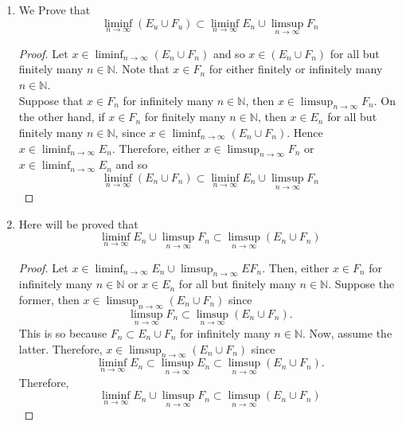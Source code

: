 \documentclass[12pt]{article}
\newcommand{\N}{\mathbb{N}}
\newenvironment{problem}[2][Problem]{\begin{trivlist}
		\item[\hskip \labelsep {\bfseries #1}\hskip \labelsep {\bfseries #2.}]}{\end{trivlist}}
\begin{document}
\begin{problem}{1}
\begin{enumerate}[label=(\alph*)]
\begin{enumerate}[label=\textbf{\arabic*.}]
         \item We Prove that 
         	\begin{equation*}
         	 \liminf_{n\to \infty}\left(E_{u}\cup F_{u}\right) \subset \liminf_{n\to \infty} E_{n} \cup  \limsup_{n\to \infty} F_{n}
         \end{equation*}
         \begin{proof}
         	Let $x\in \liminf_{n\to \infty}\left(E_{n}\cup F_{n}\right)$ and so $x\in \left(E_{n}\cup F_{n}\right)$ for all but finitely many $n\in \N$. Note that $x\in F_{n}$ for either finitely or infinitely many $n\in \N$.\\
         	
         	 Suppose that $x\in F_{n}$ for infinitely many $n\in \N$, then $x\in \limsup_{n\to \infty} F_{n}$. On the other hand, if $x\in F_{n}$ for finitely many $n\in \N$, then $x\in E_{n}$ for all but finitely many $n\in \N$, since $x\in \liminf_{n\to \infty}\left(E_{n}\cup F_{n}\right)$. Hence $x\in \liminf_{n\to \infty} E_{n}$. Therefore, either $x\in \limsup_{n\to \infty} F_{n}$ or $x \in \liminf_{n\to \infty} E_{n}$ and so 
         	 \begin{equation*}
         	 	\liminf_{n\to \infty}\left(E_{n}\cup F_{n}\right) \subset \liminf_{n\to \infty} E_{n} \cup  \limsup_{n\to \infty} F_{n}
         	 \end{equation*}
			\end{proof}
		
		\item Here will be proved that 
		\begin{equation*}
			\liminf_{n\to \infty} E_{n} \cup  \limsup_{n\to \infty} F_{n} \subset \limsup_{n\to \infty} \left(E_{n} \cup F_{n}\right)
		\end{equation*}
		\begin{proof}
			Let $x\in \liminf_{n\to \infty} E_{n} \cup  \limsup_{n\to \infty} EF_{n}$. Then, either $x\in F_{n}$ for infinitely many $n\in \N$ or $x\in E_{n}$ for all but finitely many $n\in \N$. Suppose the former, then $x\in \limsup_{n\to \infty} (E_{n}\cup F_{n})$ since
			\begin{equation*}
				\limsup_{n\to \infty} F_{n} \subset \limsup_{n\to \infty} (E_{n}\cup F_{n}).
			\end{equation*} 
		This is so because $F_{n} \subset E_{n}\cup F_{n}$ for infinitely many $n\in \N$.
		Now, assume the latter. Therefore, $x\in \limsup_{n\to \infty} (E_{n}\cup F_{n})$ since
		\begin{equation*}
			\liminf_{n\to \infty} E_{n} \subset \limsup_{n\to \infty} E_{n} \subset \limsup_{n\to \infty} \left(E_{n}\cup F_{n}\right). 
		\end{equation*}
	Therefore,
	\begin{equation*}
		\liminf_{n\to \infty} E_{n} \cup  \limsup_{n\to \infty} F_{n} \subset \limsup_{n\to \infty} \left(E_{n} \cup F_{n}\right)
	\end{equation*}  
		\end{proof}
	

\end{enumerate}
\end{enumerate}
\end{problem}
\end{document}
